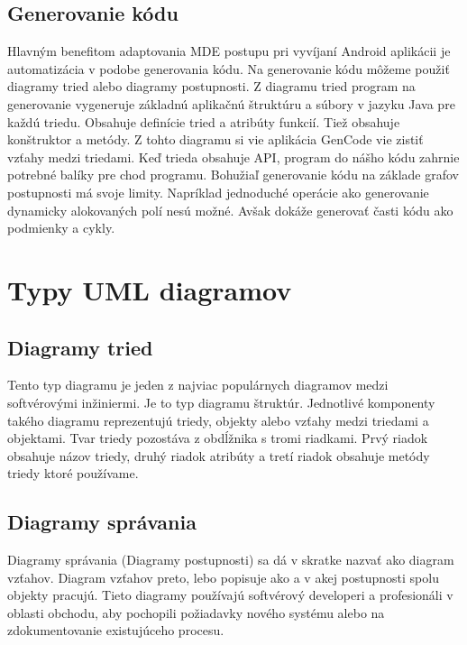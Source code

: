 \documentclass[10pt,twoside,slovak,a4paper]{article}
\begin{document}
\subsection{Generovanie kódu}\label{Generovanie kódu}
Hlavným benefitom adaptovania MDE postupu pri vyvíjaní Android aplikácii je automatizácia v podobe generovania kódu. Na generovanie kódu môžeme použiť diagramy tried alebo diagramy postupnosti.\newline
Z diagramu tried program na generovanie vygeneruje základnú aplikačnú štruktúru a súbory v jazyku Java pre každú triedu. Obsahuje definície tried a atribúty funkcií. Tiež obsahuje konštruktor a metódy. Z tohto diagramu si vie aplikácia GenCode vie zistiť vzťahy medzi triedami. Keď trieda obsahuje API, program do nášho kódu zahrnie potrebné balíky pre chod programu.\newline
Bohužiaľ generovanie kódu na základe grafov postupnosti má svoje limity. Napríklad jednoduché operácie ako generovanie dynamicky alokovaných polí nesú možné. Avšak dokáže generovať časti kódu ako podmienky a cykly.\cite{GenerovanieAndroid}



\section{Typy UML diagramov} \label{Typy UML diagramov}
    \subsection{Diagramy tried}\label{Typy UML diagramov:Diagramy správania}
    Tento typ diagramu je jeden z najviac populárnych diagramov medzi softvérovými inžiniermi. Je to typ diagramu štruktúr. Jednotlivé komponenty takého diagramu reprezentujú triedy, objekty alebo vzťahy medzi triedami a objektami.\newline
    Tvar triedy pozostáva z obdĺžnika s tromi riadkami. Prvý riadok obsahuje názov triedy, druhý riadok atribúty a tretí riadok obsahuje metódy triedy ktoré používame. \cite{DiagramyTried}

    \subsection{Diagramy správania}\label{Typy UML diagramov:Diagramy štruktúry}
    Diagramy správania (Diagramy postupnosti) sa dá v skratke nazvať ako diagram vzťahov. Diagram vzťahov preto, lebo popisuje ako a v akej postupnosti spolu objekty pracujú.\newline
    Tieto diagramy používajú softvérový developeri a profesionáli v oblasti obchodu, aby pochopili požiadavky nového systému alebo na zdokumentovanie existujúceho procesu. \cite{DiagramySprávania}
\end{document}
